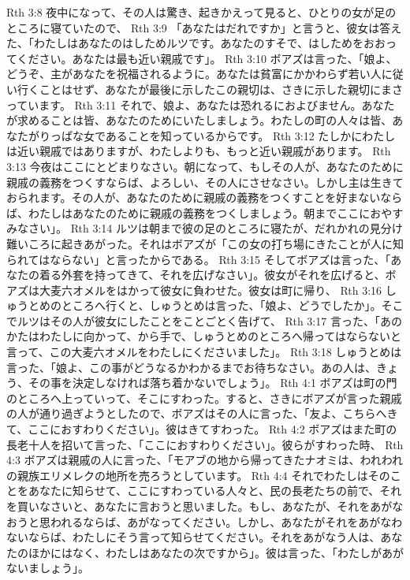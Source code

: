 Rth 3:8  夜中になって、その人は驚き、起きかえって見ると、ひとりの女が足のところに寝ていたので、
Rth 3:9  「あなたはだれですか」と言うと、彼女は答えた、「わたしはあなたのはしためルツです。あなたのすそで、はしためをおおってください。あなたは最も近い親戚です」。
Rth 3:10  ボアズは言った、「娘よ、どうぞ、主があなたを祝福されるように。あなたは貧富にかかわらず若い人に従い行くことはせず、あなたが最後に示したこの親切は、さきに示した親切にまさっています。
Rth 3:11  それで、娘よ、あなたは恐れるにおよびません。あなたが求めることは皆、あなたのためにいたしましょう。わたしの町の人々は皆、あなたがりっぱな女であることを知っているからです。
Rth 3:12  たしかにわたしは近い親戚ではありますが、わたしよりも、もっと近い親戚があります。
Rth 3:13  今夜はここにとどまりなさい。朝になって、もしその人が、あなたのために親戚の義務をつくすならば、よろしい、その人にさせなさい。しかし主は生きておられます。その人が、あなたのために親戚の義務をつくすことを好まないならば、わたしはあなたのために親戚の義務をつくしましょう。朝までここにおやすみなさい」。
Rth 3:14  ルツは朝まで彼の足のところに寝たが、だれかれの見分け難いころに起きあがった。それはボアズが「この女の打ち場にきたことが人に知られてはならない」と言ったからである。
Rth 3:15  そしてボアズは言った、「あなたの着る外套を持ってきて、それを広げなさい」。彼女がそれを広げると、ボアズは大麦六オメルをはかって彼女に負わせた。彼女は町に帰り、
Rth 3:16  しゅうとめのところへ行くと、しゅうとめは言った、「娘よ、どうでしたか」。そこでルツはその人が彼女にしたことをことごとく告げて、
Rth 3:17  言った、「あのかたはわたしに向かって、から手で、しゅうとめのところへ帰ってはならないと言って、この大麦六オメルをわたしにくださいました」。
Rth 3:18  しゅうとめは言った、「娘よ、この事がどうなるかわかるまでお待ちなさい。あの人は、きょう、その事を決定しなければ落ち着かないでしょう」。
Rth 4:1  ボアズは町の門のところへ上っていって、そこにすわった。すると、さきにボアズが言った親戚の人が通り過ぎようとしたので、ボアズはその人に言った、「友よ、こちらへきて、ここにおすわりください」。彼はきてすわった。
Rth 4:2  ボアズはまた町の長老十人を招いて言った、「ここにおすわりください」。彼らがすわった時、
Rth 4:3  ボアズは親戚の人に言った、「モアブの地から帰ってきたナオミは、われわれの親族エリメレクの地所を売ろうとしています。
Rth 4:4  それでわたしはそのことをあなたに知らせて、ここにすわっている人々と、民の長老たちの前で、それを買いなさいと、あなたに言おうと思いました。もし、あなたが、それをあがなおうと思われるならば、あがなってください。しかし、あなたがそれをあがなわないならば、わたしにそう言って知らせてください。それをあがなう人は、あなたのほかにはなく、わたしはあなたの次ですから」。彼は言った、「わたしがあがないましょう」。
